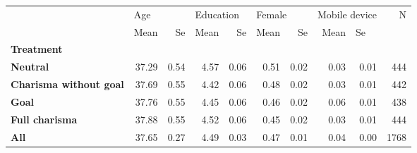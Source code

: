 \begin{tabular}{lrrrrrrrrr}
\toprule
{} & \multicolumn{2}{l}{Age} & \multicolumn{2}{l}{Education} & \multicolumn{2}{l}{Female} & \multicolumn{2}{l}{Mobile device} &     N \\
{} &  Mean &   Se &      Mean &   Se &   Mean &   Se &          Mean & \multicolumn{2}{l}{Se} \\
\textbf{Treatment            } &       &      &           &      &        &      &               &      &       \\
\midrule
\textbf{Neutral              } & 37.29 & 0.54 &      4.57 & 0.06 &   0.51 & 0.02 &          0.03 & 0.01 &   444 \\
\textbf{Charisma without goal} & 37.69 & 0.55 &      4.42 & 0.06 &   0.48 & 0.02 &          0.03 & 0.01 &   442 \\
\textbf{Goal                 } & 37.76 & 0.55 &      4.45 & 0.06 &   0.46 & 0.02 &          0.06 & 0.01 &   438 \\
\textbf{Full charisma        } & 37.88 & 0.55 &      4.52 & 0.06 &   0.45 & 0.02 &          0.03 & 0.01 &   444 \\
\textbf{All                  } & 37.65 & 0.27 &      4.49 & 0.03 &   0.47 & 0.01 &          0.04 & 0.00 &  1768 \\
\bottomrule
\end{tabular}

